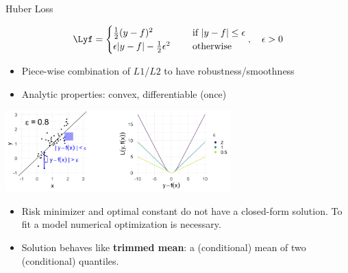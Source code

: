 \documentclass[11pt,compress,t,notes=noshow, xcolor=table]{beamer}
\begin{document}
\begin{vbframe}{Huber Loss}

\vspace*{-0.5cm}

$$
\Lyf = \begin{cases}
  \frac{1}{2}(y - f)^2  & \text{ if } |y - f| \le \epsilon \\
  \epsilon |y - f|-\frac{1}{2}\epsilon^2 \quad & \text{ otherwise }
  \end{cases}, \quad \epsilon > 0
$$

\begin{itemize}
\item Piece-wise combination of $L1$/$L2$ to have robustness/smoothness
\item Analytic properties: convex, differentiable (once)
\end{itemize}



\begin{center}
\includegraphics[width = 0.65\textwidth]{figure/loss_huber_plot.png}
\end{center}

\vspace*{-0.2cm}

\begin{itemize}
\item Risk minimizer and optimal constant do not have a closed-form solution. To fit a model numerical optimization is necessary. 
\item Solution behaves like \textbf{trimmed mean}: a (conditional) mean of two (conditional) quantiles. %
\end{itemize}


\end{vbframe}
\end{document}
